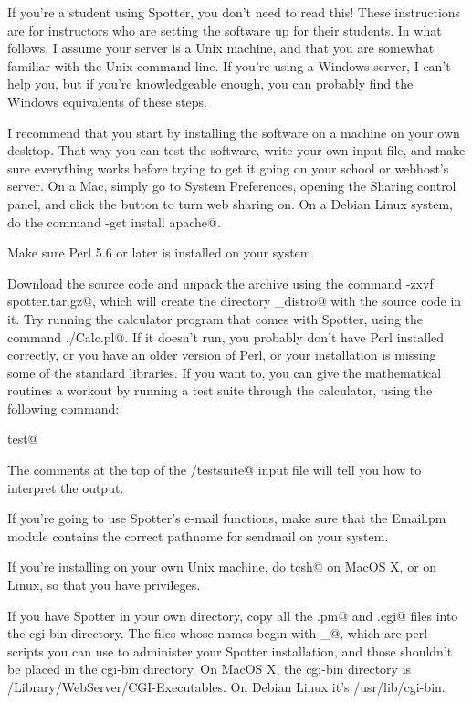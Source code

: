 \documentclass{doc}
\begin{document}
\label{setup}

If you're a student using Spotter, you don't need to read this!
These instructions are for instructors who are setting the software
up for their students. In what follows, I assume your server is
a Unix machine, and that you are somewhat familiar with the Unix
command line. If you're using a Windows server, I can't help you,
but if you're knowledgeable enough, you can probably find the Windows
equivalents of these steps. 

I recommend that you start by installing the software on a machine
on your own desktop. That way you can test the software, write your
own input file, and make sure everything works before trying to get
it going on your school or webhost's server. On a Mac,
 simply go to System Preferences, opening the Sharing control panel,
and click the button to turn web sharing on. On a Debian Linux
system, do the command \verb@apt-get install apache@.


Make sure Perl 5.6 or later is installed on your system.

Download the
source code and unpack the archive using the command
\verb@tar -zxvf spotter.tar.gz@, which will create the directory
\verb@spotter_distro@ with the source code in it. Try running the
calculator program that comes with Spotter, using the command
\verb@./Calc.pl@. If it doesn't run, you probably don't have Perl
installed correctly, or you have an older version of Perl, or your
installation is missing some of the standard libraries. If you want
to, you can give the mathematical routines a workout by running
a test suite through the calculator, using the following command:

\noindent\verb@make test@

The comments at the top of the \verb@tests/testsuite@ input file will
tell you how to interpret the output.

If you're going to use Spotter's e-mail functions, make sure that
the Email.pm module contains the correct pathname for sendmail
on your system.

If you're
installing on your own Unix machine, do \verb@sudo tcsh@ on MacOS X,
or \verb@su@ on Linux, 
so that you have privileges.

If you have Spotter in your own directory, copy all the \verb@.pm@ and \verb@.cgi@ files into
the cgi-bin directory.
The files whose names begin with
\verb@admin_@, which are perl scripts you can use to administer
your Spotter installation, and those shouldn't be placed in the cgi-bin directory.
On MacOS X, the cgi-bin directory is /Library/WebServer/CGI-Executables.
On Debian Linux it's /usr/lib/cgi-bin. 
\end{document}
